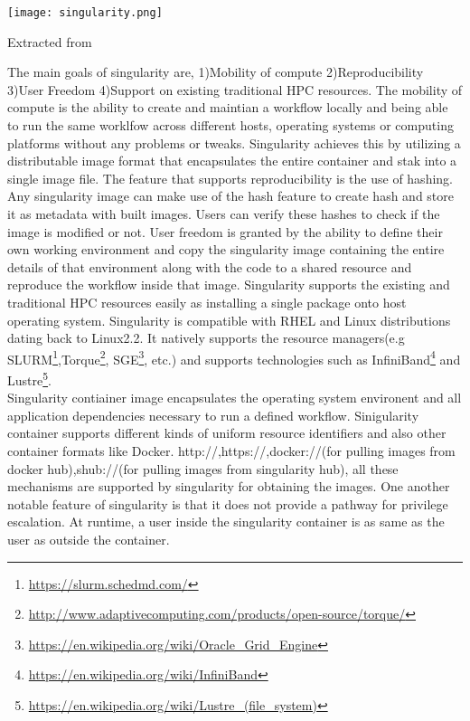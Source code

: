 \begin{center}
\texttt{[image: singularity.png]}
\label{fig:singularity_workflow}
\caption*{Extracted from \cite{10.1371/journal.pone.0177459}}
\end{center}

The main goals of singularity are, 1)Mobility of compute 2)Reproducibility 3)User Freedom 4)Support on existing traditional HPC resources. The mobility of compute is the ability to create and maintian a workflow locally and being able to run the same worklfow across different hosts, operating systems or computing platforms without any problems or tweaks. Singularity achieves this by utilizing a distributable image format that encapsulates the entire container and stak into a single image file. The feature that supports reproducibility is the use of hashing. Any singularity image can make use of the hash feature to create hash and store it as metadata with built images. Users can verify these hashes to check if the image is modified or not. User freedom is granted by the ability to define their own working environment and copy the singularity image containing the entire details of that environment along with the code to a shared resource and reproduce the workflow inside that image. Singularity supports the existing and traditional HPC resources easily as installing a single package onto host operating system. Singularity is compatible with RHEL and Linux distributions dating back to Linux2.2. It natively supports the resource managers(e.g SLURM\footnote{\url{https://slurm.schedmd.com/}},Torque\footnote{\url{http://www.adaptivecomputing.com/products/open-source/torque/}}, SGE\footnote{\url{https://en.wikipedia.org/wiki/Oracle_Grid_Engine}}, etc.) and supports technologies such as InfiniBand\footnote{\url{https://en.wikipedia.org/wiki/InfiniBand}} and Lustre\footnote{\url{https://en.wikipedia.org/wiki/Lustre_(file_system)}}.\\

Singularity contiainer image encapsulates the operating system environent and all application dependencies necessary to run a defined workflow. Sinigularity container supports different kinds of uniform resource identifiers and also other container formats like Docker. http://,https://,docker://(for pulling images from docker hub),shub://(for pulling images from singularity hub), all these mechanisms are supported by singularity for obtaining the images. One another notable feature of singularity is that it does not provide a pathway for privilege escalation. At runtime, a user inside the singularity container is as same as the user as outside the container.
 
